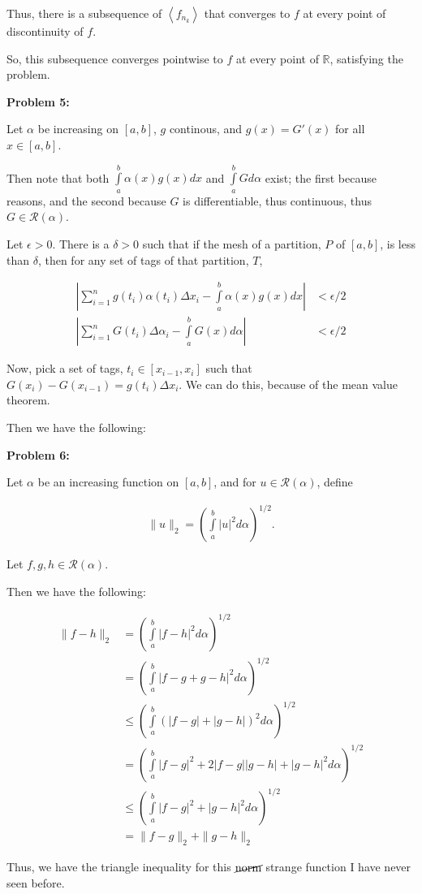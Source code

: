 \documentclass[a4paper,12pt]{article}
\newcommand{\shunt}{\vspace{20mm}}
\newcommand{\absval}[1]{\left\lvert #1 \right\rvert}
\newcommand{\norm}[1]{\|#1\|}
\newcommand{\anbrack}[1]{\left\langle #1 \right\rangle}
\newcommand{\al}{\alpha} %
\newcommand{\de}{\delta}
\newcommand{\De}{\Delta}
\newcommand{\ep}{\epsilon}
\newcommand{\R}{\mathbb{R}}
\newcommand{\scrR}{\mathcal{R}}
\begin{document}
Thus, there is a subsequence of $\anbrack{f_{n_k}}$ that converges to $f$ at every point of discontinuity of $f$. 

So, this subsequence converges pointwise to $f$ at every point of $\R$, satisfying the problem. 



\shunt

{\bf Problem 5:}

Let $\al$ be increasing on $[a,b]$, $g$ continous, and $g(x) = G'(x)$ for all $x \in [a,b]$.

Then note that both $\int\limits_a^b \al(x)g(x)dx$ and $\int\limits_a^b Gd\al$ exist; the first because reasons, and the second because $G$ is differentiable, thus continuous, thus $G \in \scrR(\al)$.

Let $\ep >0$. There is a $\de >0$ such that if the mesh of a partition, $P$ of $[a,b]$, is less than $\de$, then for any set of tags of that partition, $T$,

\begin{align*}
\absval{\sum\limits_{i=1}^n g(t_i)\al(t_i) \Delta x_i - \int\limits_a^b \al(x)g(x)dx} &< \ep/2 \\
\absval{\sum\limits_{i=1}^n G(t_i)\Delta \al_i - \int\limits_a^b G(x)d\al} &< \ep/2
\end{align*}

Now, pick a set of tags, $t_i \in [x_{i-1},x_i]$ such that $G(x_i) - G(x_{i-1}) = g(t_i)\De x_i$. We can do this, because of the mean value theorem.

Then we have the following:

\shunt

{\bf Problem 6:}

Let $\al$ be an increasing function on $[a,b]$, and for $u \in \scrR (\al)$, define

\begin{align*}
\norm{u}_2 = \left(\int\limits_a^b \absval{u}^2 d\al \right)^{1/2}.
\end{align*}

Let $f,g,h \in \scrR(\al)$.

Then we have the following:

\begin{align*}
\norm{f-h}_2 &= \left(\int\limits_a^b \absval{f-h}^2 d\al \right)^{1/2}\\
&= \left(\int\limits_a^b \absval{f-g+g-h}^2 d\al \right)^{1/2}\\
&\leq \left(\int\limits_a^b (\absval{f-g} + \absval{g-h})^2 d\al \right)^{1/2}\\
&= \left(\int\limits_a^b \absval{f-g}^2 + 2\absval{f-g}\absval{g-h} + \absval{g-h}^2 d\al \right)^{1/2}\\
&\leq \left(\int\limits_a^b \absval{f-g}^2 + \absval{g-h}^2 d\al \right)^{1/2}\\
&= \norm{f-g}_2 + \norm{g-h}_2
\end{align*}

Thus, we have the triangle inequality for this $\cancel{\text{norm}}$ strange function I have never seen before.

\shunt
\end{document}

